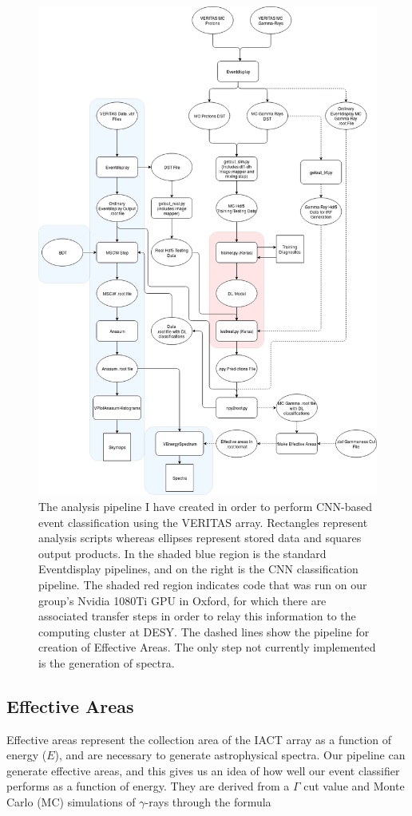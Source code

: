 \begin{figure}[t!] 
        \centering \includegraphics[width=0.75\columnwidth]{figures/Gettingout.png}

        \caption{
                \label{fig:Gettingout} The analysis pipeline I have created in order to perform CNN-based event classification using the VERITAS array. Rectangles represent analysis scripts whereas ellipses represent stored data and squares output products. In the shaded blue region is the standard Eventdisplay pipelines, and on the right is the CNN classification pipeline. The shaded red region indicates code that was run on our group's Nvidia 1080Ti GPU in Oxford, for which there are associated transfer steps in order to relay this information to the computing cluster at DESY. The dashed lines show the pipeline for creation of Effective Areas. The only step not currently implemented is the generation of spectra.
        }
\end{figure}

\subsection{Effective Areas}
 Effective areas represent the collection area of the IACT array as a function of energy ($E$), and are necessary to generate astrophysical spectra. Our pipeline can generate effective areas, and this gives us an idea of how well our event classifier performs as a function of energy.  They are derived from a $\Gamma$ cut value and Monte Carlo (MC) simulations of $\gamma$-rays through the formula


